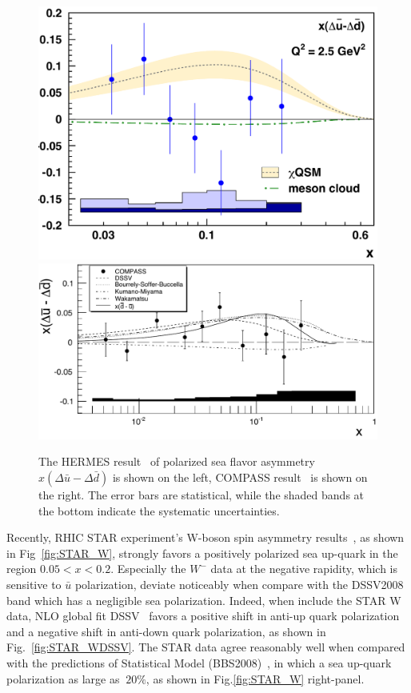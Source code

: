 \begin{figure} [htbp]
  \centering
    \includegraphics[width=0.41\linewidth]{figs_xj/hermes_dubar_ddbar2005.pdf}
    \includegraphics[width=0.58\linewidth]{figs_xj/compass_dbar_ubar2010.pdf} \\
  \caption{\label{fig:polubardbar} 
  The HERMES result~\cite{Airapetian:2004zf} of 
 polarized sea flavor asymmetry
$x(\Delta \bar{u} - \Delta \bar{d})$ is shown on the left, COMPASS result~\cite{Alekseev:2010ub} is shown on the right.
The error bars are statistical, while the shaded bands at the bottom indicate the systematic
uncertainties.}
\end{figure}

Recently, RHIC STAR experiment's W-boson spin asymmetry results~\cite{Adamczyk:2014xyw}, as shown in Fig~\ref{fig:STAR_W}, strongly favors a positively polarized sea up-quark in the region $0.05<x<0.2$.  Especially the $W^-$ data at the negative rapidity, which is sensitive to $\bar{u}$ polarization,  deviate noticeably when compare with the DSSV2008 band which has a negligible sea polarization.  Indeed, when include the STAR W data,  NLO global fit DSSV~\cite{DSSV2008} favors a positive shift in  anti-up quark polarization and a negative shift in anti-down quark polarization, as shown in Fig.~\ref{fig:STAR_WDSSV}.
The STAR data agree reasonably well when compared with the predictions of  Statistical Model (BBS2008)~\cite{Bourrely200739}, in which a sea up-quark polarization as large as $~20\%$, as shown in Fig.\ref{fig:STAR_W} right-panel.

